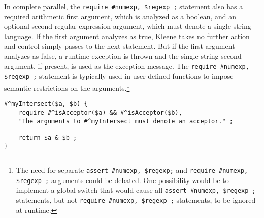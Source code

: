 In complete parallel, the \verb!require #numexp, $regexp ;! statement also has a required arithmetic first
argument, which is analyzed as a boolean, and an optional second
regular-expression argument, which must denote a single-string language.  If
the first argument analyzes as true, Kleene takes no further action and control simply passes to the next
statement.  But if the first argument analyzes as false, a runtime exception is thrown and
the single-string second argument, if present, is used as the exception
message.  The \verb!require #numexp, $regexp ;! statement is typically used
in user-defined functions to impose semantic restrictions on the
arguments.\footnote{The need for separate \verb!assert #numexp, $regexp;!
and \verb!require #numexp, $regexp ;! arguments could be debated.  One
possibility would be to implement a global switch that would cause all
\verb!assert #numexp, $regexp ;! statements, but not 
\verb!require #numexp, $regexp ;! statements, to be ignored at runtime.}

\begin{Verbatim}[fontsize=\small]
#^myIntersect($a, $b) {
	require #^isAcceptor($a) && #^isAcceptor($b), 
    "The arguments to #^myIntersect must denote an acceptor." ;

	return $a & $b ;
}
\end{Verbatim}


